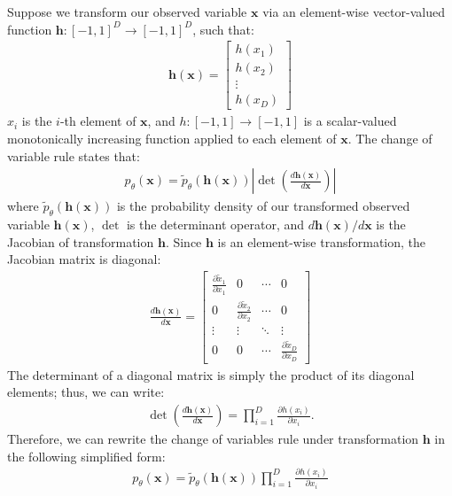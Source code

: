 \documentclass[ oneside,%
                    author={George Herbert},
                    degree={MSci},
                     title={Video Diffusion Models for Climate Simulations},
                  subtitle={}]{dissertation}
\begin{document}
Suppose we transform our observed variable $\mathbf{x}$ via an element-wise vector-valued function $\mathbf{h}:[-1, 1]^D\to[-1,1]^D$, such that:
\begin{align}
      \mathbf{h}(\mathbf{x})=
      \begin{bmatrix}
            h(x_1) \\
            h(x_2) \\
            \vdots \\
            h(x_D)
      \end{bmatrix}
\end{align}
$x_i$ is the $i$-th element of $\mathbf{x}$, and $h:[-1, 1]\to[-1,1]$ is a scalar-valued monotonically increasing function applied to each element of $\mathbf{x}$. The change of variable rule states that:
\begin{align}
      p_\theta(\mathbf{x}) = \tilde{p}_\theta(\mathbf{h}(\mathbf{x}))\left|\det\left(\frac{d \mathbf{h}(\mathbf{x})}{d \mathbf{x}}\right)\right|
\end{align}
where $\tilde{p}_\theta(\mathbf{h}(\mathbf{x}))$ is the probability density of our transformed observed variable $\mathbf{h}(\mathbf{x})$, $\det$ is the determinant operator, and $d\mathbf{h}(\mathbf{x})/d\mathbf{x}$ is the Jacobian of transformation $\mathbf{h}$. Since $\mathbf{h}$ is an element-wise transformation, the Jacobian matrix is diagonal:
\begin{align}
      \frac{d\mathbf{h}(\mathbf{x})}{d\mathbf{x}} =
      \begin{bmatrix}
            \frac{\partial \tilde{x}_1}{\partial x_1} & 0 & \cdots & 0 \\
            0 & \frac{\partial \tilde{x}_2}{\partial x_2} & \cdots & 0 \\
            \vdots & \vdots & \ddots & \vdots \\
            0 & 0 & \cdots & \frac{\partial \tilde{x}_D}{\partial x_D}
      \end{bmatrix}
\end{align}
The determinant of a diagonal matrix is simply the product of its diagonal elements; thus, we can write:
\begin{align}
      \det\left(\frac{d\mathbf{h}(\mathbf{x})}{d\mathbf{x}}\right) = \prod_{i=1}^D \frac{\partial h(x_i)}{\partial x_i}.
\end{align}
Therefore, we can rewrite the change of variables rule under transformation $\mathbf{h}$ in the following simplified form:
\begin{align}
      p_\theta(\mathbf{x}) = \tilde{p}_\theta(\mathbf{h}(\mathbf{x}))\prod_{i=1}^D \frac{\partial h(x_i)}{\partial x_i}
\end{align}
\end{document}

